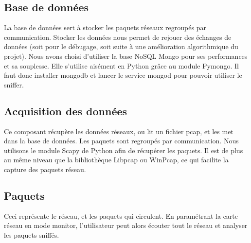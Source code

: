 \subsection{Base de données}
La base de données sert à stocker les paquets réseaux regroupés par communication. Stocker les données nous permet de rejouer des échanges de données (soit pour le débugage, soit suite à une amélioration algorithmique du projet).	
Nous avons choisi d'utiliser la base NoSQL Mongo pour ses performances et sa souplesse. Elle s'utilise aisément en Python grâce au module Pymongo. Il faut donc installer mongodb et lancer le service mongod pour pouvoir utiliser le sniffer.

\subsection{Acquisition des données}
Ce composant récupère les données réseaux, ou lit un fichier pcap, et les met dans la base de données. Les paquets sont regroupés par communication.
Nous utilisons le module Scapy de Python afin de récupérer les paquets. Il est de plus au même niveau que la bibliothèque Libpcap ou WinPcap, ce qui facilite la capture des paquets réseau. 

\subsection{Paquets}
Ceci représente le réseau, et les paquets qui circulent. En paramétrant la carte réseau en mode monitor, l'utilisateur peut alors écouter tout le réseau et analyser les paquets sniffés.


